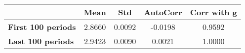 \begin{tiny}\begin{tabular}{|l|c|c|c|c|}
\hline
&\textbf{Mean}&\textbf{Std}&\textbf{AutoCorr}&\textbf{Corr with g}\\\hline
\textbf{First 100 periods}&2.8660&0.0092&-0.0198&0.9592\\\hline
\textbf{Last 100 periods}&2.9423&0.0090&0.0021&1.0000\\\hline
\end{tabular}
\end{tiny}